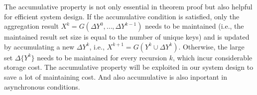 \begin{comment}
\begin{proof}
	\label{sec:app:proof:monotonic}
	It is known that $\Delta Y^k=F(\Delta X^k)$and $\Delta X^0=X^0$.
	\begin{align}
	&G\Big(\Delta Y^0\cup (F\circ G)(\Delta Y^0)\cup\ldots\cup (F\circ G)^k(\Delta Y^0)\Big)\tag{1} \\
	=&G\Big(G(\Delta Y^0)\cup (F\circ G)(\Delta Y^0)\cup \ldots \cup (F\circ G)^k( \Delta Y^0)\Big)\tag{2}\\
	=&G\Big(F\circ G(\Delta Y^0)\cup (F\circ G)^2(\Delta Y^0)\cup \ldots \cup (F\circ G)^k(\Delta Y^0)\Big) \tag{3}\\
	=& \ldots \notag \\
	=&G\Big((F\circ G)^k(\Delta Y^0)\Big)\tag{4}\\
	=&(G \circ F)^{k+1}(X^0).\tag{5}
	\end{align}
	Line 3 is true because of the accumulative property. Due to the monotonic property line 4 is true .By repeat applying these two properties, we can reduce the original formula to line 5, the result of normal recursive aggregation. 
\end{proof}
\end{comment}
The accumulative property is not only essential in theorem proof but also helpful for efficient system design. If the accumulative condition is satisfied, only the aggregation result $X^k=G(\Delta Y^{0},\ldots,\Delta Y^{k-1})$ needs to be maintained (i.e., the maintained result set size is equal to the number of unique keys) and is updated by accumulating a new $\Delta Y^{k}$, i.e., $X^{k+1}=G(Y^k \cup \Delta Y^k)$. Otherwise, the large set $\Delta \{Y^{k}\}$ needs to be maintained for every recursion $k$, which incur considerable storage cost. The accumulative property will be exploited in our system design to save a lot of maintaining cost. And also accumulative is also inportant in asynchronous conditions.

